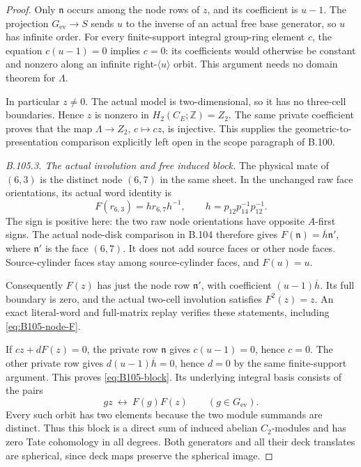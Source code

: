 \begin{proof}
Only $\mathfrak n$ occurs among the node rows of $z$, and its
coefficient is $u-1$. The projection $G_{\mathrm{ev}}\to S$ sends
$u$ to the inverse of an actual free base generator, so $u$
has infinite order. For every finite-support integral group-ring
element $c$, the equation $c(u-1)=0$ implies $c=0$: its
coefficients would otherwise be constant and nonzero along an
infinite right-$\langle u\rangle$ orbit. This argument needs
no domain theorem for $\Lambda$.

In particular $z\ne0$. The actual model is two-dimensional,
so it has no three-cell boundaries. Hence $z$ is nonzero in
$H_2(C_E;\mathbb Z)=Z_2$. The same private coefficient proves
that the map $\Lambda\to Z_2$, $c\mapsto cz$, is injective.
This supplies the geometric-to-presentation comparison explicitly
left open in the scope paragraph of B.100.

\emph{B.105.3. The actual involution and free induced block.}
The physical mate of $(6,3)$ is the distinct node $(6,7)$ in
the same sheet. In the unchanged raw face orientations, its
actual word identity is
\begin{equation}\label{eq:B105-node-F}
 F(r_{6,3})=h r_{6,7}h^{-1},\qquad
             h=p_{12}p_{14}^{-1}p_{12}^{-1}.
\end{equation}
The sign is positive here: the two raw node orientations have
opposite $A$-first signs. The actual node-disk comparison in
B.104 therefore gives $F(\mathfrak n)=\overline h\mathfrak n'$,
where $\mathfrak n'$ is the face $(6,7)$. It does not add source
faces or other node faces. Source-cylinder faces stay among
source-cylinder faces, and $F(u)=u$.

Consequently $F(z)$ has just the node row $\mathfrak n'$,
with coefficient $(u-1)\overline h$. Its full boundary is zero,
and the actual two-cell involution satisfies $F^2(z)=z$.
An exact literal-word and full-matrix replay verifies these
statements, including \eqref{eq:B105-node-F}.

If $c z+dF(z)=0$, the private row $\mathfrak n$ gives
$c(u-1)=0$, hence $c=0$. The other private row gives
$d(u-1)\overline h=0$, hence $d=0$ by the same finite-support
argument. This proves \eqref{eq:B105-block}. Its underlying
integral basis consists of the pairs
\[
       g z\ \longleftrightarrow\ F(g)F(z)
                 \qquad(g\in G_{\mathrm{ev}}).
\]
Every such orbit has two elements because the two module
summands are distinct. Thus this block is a direct sum of
induced abelian $C_2$-modules and has zero Tate cohomology in
all degrees. Both generators and all their deck translates are
spherical, since deck maps preserve the spherical image.


\end{proof}
